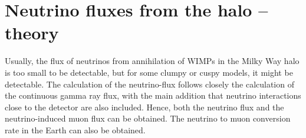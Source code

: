 \section{Neutrino fluxes from the halo -- theory}


Usually, the flux of neutrinos from annihilation of WIMPs in
the Milky Way halo is too small to be detectable, but for some clumpy
or cuspy models, it might be detectable. The calculation of the
neutrino-flux follows closely the calculation of the continuous gamma
ray flux, with the main addition that neutrino interactions close to
the detector are also included. Hence, both the neutrino flux and the
neutrino-induced muon flux can be obtained. The neutrino to muon
conversion rate in the Earth can also be obtained.
